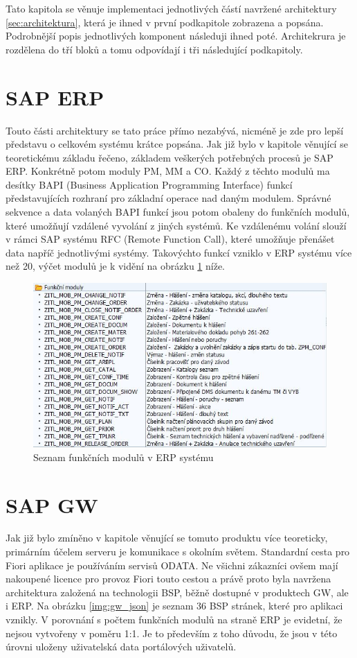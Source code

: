 \documentclass[thesis=M,czech]{FITthesis}[2012/06/26]
\begin{document}
Tato kapitola se věnuje implementaci jednotlivých částí navržené architektury \ref{sec:architektura}, která je ihned v první podkapitole zobrazena a popsána. Podrobnější popis jednotlivých komponent následuji ihned poté. Architekrura je rozdělena do tří bloků a tomu odpovídají i tři následující podkapitoly. 

\section{SAP ERP}
Touto části architektury se tato práce přímo nezabývá, nicméně je zde pro lepší představu o celkovém systému krátce popsána. Jak již bylo v kapitole věnující se teoretickému základu řečeno, základem veškerých potřebných procesů je SAP ERP. Konkrétně potom moduly PM, MM a CO. Každý z těchto modulů ma desítky BAPI (Business Application Programming Interface) funkcí představujících rozhraní pro základní operace nad daným modulem. Správné sekvence a data volaných BAPI funkcí jsou potom obaleny do funkčních modulů, které umožňují vzdálené vyvolání z jiných systémů. Ke vzdálenému volání slouží v rámci SAP systému RFC (Remote Function Call), které umožňuje přenášet data napříč jednotlivými systémy. Takovýchto funkcí vzniklo v ERP systému více než 20, výčet modulů je k vidění na obrázku \ref{img:erp_fm} níže.

\begin{figure}[H]
	\centering
	\includegraphics[width=1\textwidth]{images/erp_fm}
	\caption{Seznam funkčních modulů v ERP systému}
	\label{img:erp_fm}
\end{figure}

\section{SAP GW}
Jak již bylo zmíněno v kapitole věnující se tomuto produktu více teoreticky, primárním účelem serveru je komunikace s okolním světem. Standardní cesta pro Fiori aplikace je používáním servisů ODATA. Ne všichni zákazníci ovšem mají nakoupené licence pro provoz Fiori touto cestou a právě proto byla navržena architektura založená na technologii BSP, běžně dostupné v produktech GW, ale i ERP. Na obrázku \ref{img:gw_json} je seznam 36 BSP stránek, které pro aplikaci vznikly. V porovnání s počtem funkčních modulů na straně ERP je evidetní, že nejsou vytvořeny v poměru 1:1. Je to především z toho důvodu, že jsou v této úrovni uloženy uživatelská data portálových uživatelů. 
\end{document}
